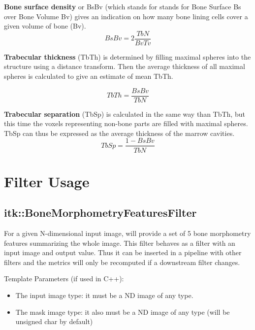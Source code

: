 \documentclass{InsightArticle}
\begin{document}
\textbf{Bone surface density} or BsBv (which stands for  stands for Bone Surface Bs over Bone Volume Bv) gives an indication on how many bone lining cells cover a given volume of bone (Bv).
\begin{equation} \label{eqn:BsBv}
BsBv = 2 \frac{TbN}{BvTv}
\end{equation}

\textbf{Trabecular thickness} (TbTh) is determined by filling maximal spheres into the structure using a distance transform. Then the average thickness of all maximal spheres is calculated to give an estimate of mean TbTh.

\begin{equation} \label{eqn:TbTh} 
TbTh = \frac{BsBv}{TbN}
\end{equation}

\textbf{Trabecular separation} (TbSp) is calculated in the same way than TbTh, but this time the voxels representing non-bone parts are filled with maximal spheres. TbSp can thus be expressed as the average thickness of the marrow cavities. 
\begin{equation} \label{eqn:TbSp}
TbSp = \frac{1 - BsBv}{TbN}
\end{equation}

\newpage
\section{Filter Usage}
\label{sec:filterUsage}

\subsection{itk::BoneMorphometryFeaturesFilter}
\label{sec:BMFilter}

For a given N-dimensional input image,  will provide a set of 5 bone morphometry features summarizing the whole image. This filter behaves as a filter with an input image and output value. Thus it can be inserted in a pipeline with other filters and the metrics will only be recomputed if a downstream filter changes.

Template Parameters (if used in C++):
\begin{itemize}
 \item The input image type: it must be a ND image of any type.
 \item The mask image type: it also must be a ND image of any type (will be unsigned char by default)
\end{itemize}
\end{document}
